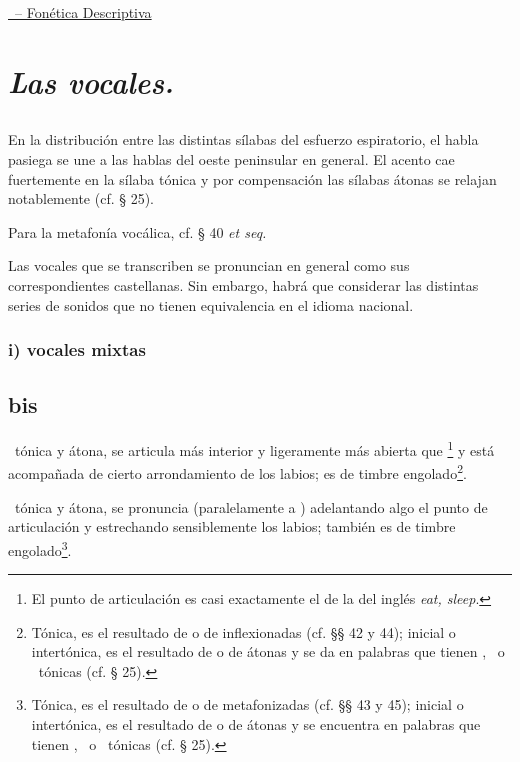 \clearpage
{}
\begin{center}
  \underline{\thechapter\ -- Fonética Descriptiva}
\end{center}
\vspace{4mm}
\section{\emph{Las vocales.}}

\subsection{} En la distribución entre las distintas sílabas del esfuerzo
espiratorio, el habla pasiega se une a las hablas del oeste peninsular en
general. El acento cae fuertemente en la sílaba tónica y por compensación las
sílabas átonas se relajan notablemente (cf. § 25).

Para la metafonía vocálica, cf. § 40 \emph{et seq.}

Las vocales que se transcriben \textipa{[a e i o u]} se pronuncian en general
como sus correspondientes castellanas. Sin embargo, habrá que considerar las
distintas series de sonidos que no tienen equivalencia en el idioma nacional.

\subsubsection*{i) vocales mixtas}

\setcounter{subsection}{20}
\subsection{ bis} \ic\ tónica y átona, se articula más interior y ligeramente
más abierta que \textipa{[i]}\footnote{El punto de articulación es casi
exactamente el de la \textipa{[i]} del inglés \emph{eat, sleep}.} y está
acompañada de cierto arrondamiento de los labios; es de timbre
engolado\footnote{Tónica, es el resultado de \textipa{[e]} o de
\textipa{[i]} inflexionadas (cf. §§ 42 y 44); inicial o intertónica, es el
resultado de \textipa{[e]} o de \textipa{[i]} átonas y se da en palabras que
tienen \ic, \uc\ o \apt\ tónicas (cf. § 25).}.

\uc\ tónica y átona, se pronuncia (paralelamente a \ic) adelantando algo el
punto de articulación y estrechando sensiblemente los labios; también es de
timbre engolado\footnote{Tónica, es el resultado de \textipa{[o]} o de
\textipa{[u]} metafonizadas (cf. §§ 43 y 45); inicial o intertónica, es el
resultado de \textipa{[o]} o de \textipa{[u]} átonas y se encuentra en
palabras que tienen \ic, \uc\ o \apt\ tónicas (cf. § 25).}.

